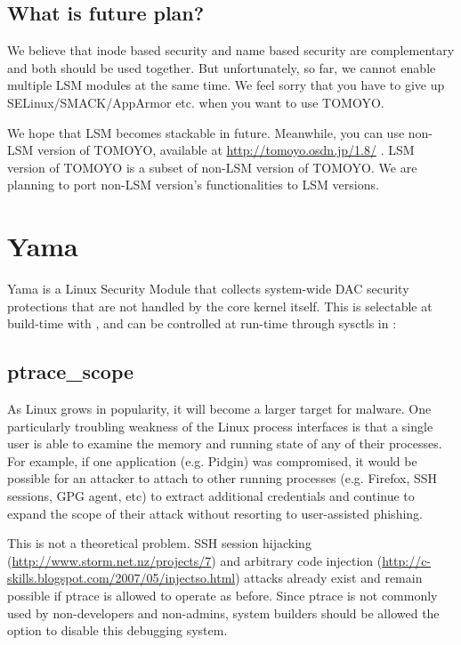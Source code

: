 \documentclass[a4paper,8pt,english]{sphinxmanual}
\begin{document}
\subsection{What is future plan?}
\label{admin-guide/LSM/tomoyo:what-is-future-plan}
We believe that inode based security and name based security are complementary
and both should be used together. But unfortunately, so far, we cannot enable
multiple LSM modules at the same time. We feel sorry that you have to give up
SELinux/SMACK/AppArmor etc. when you want to use TOMOYO.

We hope that LSM becomes stackable in future. Meanwhile, you can use non-LSM
version of TOMOYO, available at \href{http://tomoyo.osdn.jp/1.8/}{http://tomoyo.osdn.jp/1.8/} .
LSM version of TOMOYO is a subset of non-LSM version of TOMOYO. We are planning
to port non-LSM version's functionalities to LSM versions.


\section{Yama}
\label{admin-guide/LSM/Yama:yama}\label{admin-guide/LSM/Yama::doc}
Yama is a Linux Security Module that collects system-wide DAC security
protections that are not handled by the core kernel itself. This is
selectable at build-time with , and can be controlled
at run-time through sysctls in :


\subsection{ptrace\_scope}
\label{admin-guide/LSM/Yama:ptrace-scope}
As Linux grows in popularity, it will become a larger target for
malware. One particularly troubling weakness of the Linux process
interfaces is that a single user is able to examine the memory and
running state of any of their processes. For example, if one application
(e.g. Pidgin) was compromised, it would be possible for an attacker to
attach to other running processes (e.g. Firefox, SSH sessions, GPG agent,
etc) to extract additional credentials and continue to expand the scope
of their attack without resorting to user-assisted phishing.

This is not a theoretical problem. SSH session hijacking
(\href{http://www.storm.net.nz/projects/7}{http://www.storm.net.nz/projects/7}) and arbitrary code injection
(\href{http://c-skills.blogspot.com/2007/05/injectso.html}{http://c-skills.blogspot.com/2007/05/injectso.html}) attacks already
exist and remain possible if ptrace is allowed to operate as before.
Since ptrace is not commonly used by non-developers and non-admins, system
builders should be allowed the option to disable this debugging system.
\end{document}
